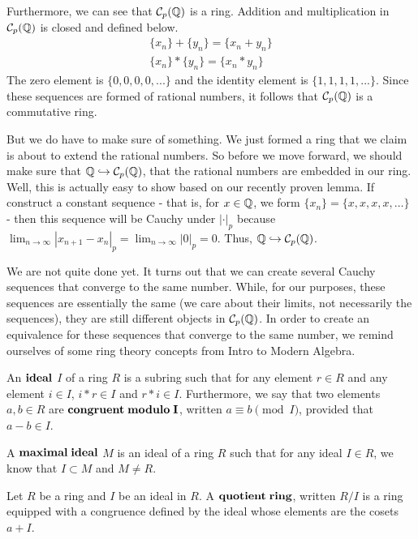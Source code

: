 \documentclass[a4paper]{article}
\begin{document}
Furthermore, we can see that \(\mathcal{C}_p(\mathbb Q)\) is a ring.  
Addition and multiplication in \(\mathcal{C}_p(\mathbb Q)\) is closed and
defined below.
\[
	\begin{gathered}
      \{x_n\}+\{y_n\}=\{x_n+y_n\}\\
      \{x_n\}*\{y_n\}=\{x_n*y_n\}
    \end{gathered}
\]
The zero element is \(\{0,0,0,0,...\}\) and the identity element 
is \(\{1,1,1,1,...\}\). Since these sequences are formed of
rational numbers, it follows that \(\mathcal{C}_p(\mathbb Q)\) is a
commutative ring.

But we do have to make sure of something.  We just formed a ring
that we claim is about to extend the rational numbers.  So before
we move forward, we should make sure that 
\(\mathbb Q\hookrightarrow \mathcal{C}_p(\mathbb Q)\), that the rational
numbers are embedded in our ring.  Well, this is actually easy to
show based on our recently proven lemma.  If construct a constant 
sequence - that is, for 
$x\in\mathbb Q$, we form $\{x_n\}=\{x,x,x,x,\dots\}$ - 
then this sequence will be Cauchy under $|\cdot|_p$ because
$\lim_{n\to\infty}|x_{n+1}-x_n|_p=\lim_{n\to\infty}|0|_p=0$.  Thus, 
\(\mathbb Q\hookrightarrow \mathcal{C}_p(\mathbb Q)\).

We are not quite done yet.  It turns out that
we can create several Cauchy sequences that converge to the same
number.  While, for our purposes, these sequences are essentially 
the same (we care about their limits, not necessarily the
sequences), they are still different objects in 
\(\mathcal{C}_p(\mathbb Q)\).  In order to create an equivalence for 
these sequences that converge to the same number, we remind 
ourselves of some ring theory concepts from Intro to Modern Algebra.

\begin{definition}
An $\bf{ideal}$ $I$ of a ring $R$ is a subring such that for
any element $r\in R$ and any element $i\in I$, $i*r\in I$ and 
$r*i\in I$.  Furthermore, we say that two elements $a,b\in R$ are 
$\bf{congruent\;modulo\;I}$, written $a\equiv b\pmod I$, provided that
$a-b\in I$.
\end{definition}

\begin{definition}
A $\bf{maximal\;ideal}$ $M$ is an ideal of a ring $R$ such that for 
any ideal $I\in R$, we know that $I\subset M$ and $M\neq R$.
\end{definition}

\begin{definition}
  Let $R$ be a ring and $I$ be an ideal in $R$.  A $\bf{quotient\;ring}$, 
  written $R/I$ is a ring equipped with a congruence defined by the ideal 
  whose elements are the cosets $a+I$.
\end{definition}
\end{document}
